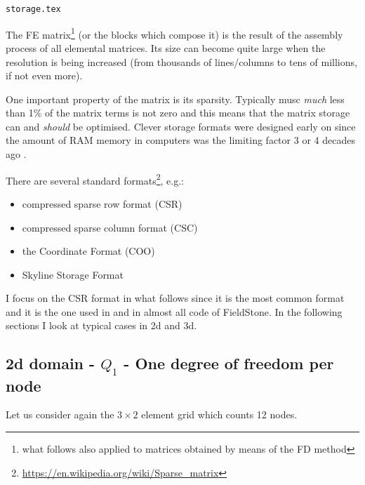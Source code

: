 \begin{flushright} {\tiny {\color{gray} \tt storage.tex}} \end{flushright}

The FE matrix\footnote{what follows also applied to matrices 
obtained by means of the FD method} (or the blocks which compose it) 
is the result of the assembly process of all elemental matrices. 
Its size can become quite large when the resolution is being increased (from thousands
of lines/columns to tens of millions, if not even more).

One important property of the matrix is its sparsity. Typically musc {\it much} less than 1\% of the 
matrix terms is not zero and this means that the matrix storage can and {\it should} be optimised. 
Clever storage formats were designed early on since the amount of RAM memory in computers
was the limiting factor 3 or 4 decades ago \cite{saad}.

There are several standard formats\footnote{\url{https://en.wikipedia.org/wiki/Sparse_matrix}}, e.g.:
\begin{itemize}
\item compressed sparse row format (CSR)  
\item compressed sparse column format (CSC)  
\item the Coordinate Format (COO)
\item Skyline Storage Format
\end{itemize}

I focus on  the CSR format in what follows since it is the most common format 
and it is the one used in \elefant and in almost all code of FieldStone. 
In the following sections I look at typical cases in 2d and 3d.

\subsection{2d domain - $Q_1$ - One degree of freedom per node}

Let us consider again the  $3\times2$ element grid which counts 12 nodes.

\begin{center}

\end{center}

